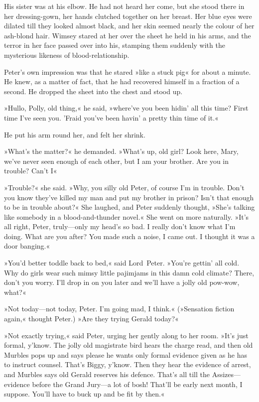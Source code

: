 His sister was at his elbow. He had not heard her come, but she stood there in her dressing-gown, her hands clutched together on her breast.  Her blue eyes were dilated till they looked almost black, and her skin seemed nearly the colour of her ash-blond hair. Wimsey stared at her over the sheet he held in his arms, and the terror in her face passed over into his, stamping them suddenly with the mysterious likeness of blood-relationship.

Peter's own impression was that he stared »like a stuck pig« for about a minute. He knew, as a matter of fact, that he had recovered himself in a fraction of a second. He dropped the sheet into the chest and stood up.

»Hullo, Polly, old thing,« he said, »where've you been hidin' all this time? First time I've seen you. 'Fraid you've been havin' a pretty thin time of it.«

He put his arm round her, and felt her shrink.

»What's the matter?« he demanded. »What's up, old girl? Look here, Mary, we've never seen enough of each other, but I am your brother. Are you in trouble? Can't I\longdash«

»Trouble?« she said. »Why, you silly old Peter, of course I'm in trouble. Don't you know they've killed my man and put my brother in prison? Isn't that enough to be in trouble about?« She laughed, and Peter suddenly thought, »She's talking like somebody in a blood-and-thunder novel.« She went on more naturally. »It's all right, Peter, truly—only my head's so bad. I really don't know what I'm doing. What are you after? You made such a noise, I came out. I thought it was a door banging.«

»You'd better toddle back to bed,« said Lord~Peter. »You're gettin' all cold. Why do girls wear such mimsy little pajimjams in this damn cold climate? There, don't you worry. I'll drop in on you later and we'll have a jolly old pow-wow, what?«

»Not today—not today, Peter. I'm going mad, I think.« (»Sensation fiction again,« thought Peter.) »Are they trying Gerald today?«

»Not exactly trying,« said Peter, urging her gently along to her room.  »It's just formal, y'know. The jolly old magistrate bird hears the charge read, and then old Murbles pops up and says please he wants only formal evidence given as he has to instruct counsel. That's Biggy, y'know. Then they hear the evidence of arrest, and Murbles says old Gerald reserves his defence. That's all till the Assizes—evidence before the Grand Jury—a lot of bosh! That'll be early next month, I suppose. You'll have to buck up and be fit by then.«

